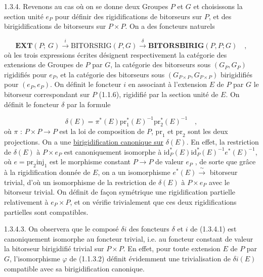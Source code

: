 1.3.4.  Revenons au cas où on se donne deux Groupes $P$ et $G$  et choisissons la section unité $e_P$ pour définir des rigidifications de bitorseurs sur $P$, et des birigidifications de bitorseurs sur $P\times P$. On a des foncteurs naturels

\begin{equation}\tag{1.3.4.1}
\mathbf{EXT}(P;\ G) \xrightarrow{\ i\ } \mathrm{BITORSRIG}(P,G) \xrightarrow{\ \delta\ } \mathbf{BITORSBIRIG}(P,P;G) \quad ,
\end{equation}
où les trois expressions écrites désignent respectivement la catégorie des extensions de Groupes de $P$ par $G$, la catégorie des bitorseurs sous $(G_P,G_P)$ rigidifiés pour $e_P$, et la catégorie des bitorseurs sous $(G_{P\times P},G_{P\times P})$ birigidifiés pour $(e_P,e_P)$. On définit le foncteur $i$ en associant à l'extension $E$ de $P$ par $G$ le bitorseur correspondant sur $P$ (1.1.6), rigidifié par la section unité de $E$. On définit le foncteur $\delta$ par la formule

\begin{equation}\tag{1.3.4.2}
\delta(E) = \pi^*(E)\mathrm{pr}_1^*(E)^{-1}\mathrm{pr}_2^*(E)^{-1} \quad ,
\end{equation}
où $\pi$ : $P\times P \longrightarrow P$ est la loi de composition de $P$, $\mathrm{pr}_1$ et $\mathrm{pr}_2$ sont les deux projections. On a une \underline{birigidification canonique sur} $\delta(E)$. En effet, la restriction de $\delta(E)$ à $P\times e_P$ est canoniquement isomorphe à $\mathrm{id}_P^*(E)\mathrm{id}_P^*(E)^{-1}e^*(E)^{-1}$, où $e = \mathrm{pr}_2\mathrm{inj}_1$ est le morphisme constant $P \longrightarrow P$ de valeur $e_P$ , de sorte que grâce à la rigidification donnée de $E$, on a un isomorphisme $e^*(E) \xrightarrow{\ \sim\ }$ bitorseur trivial, d'où un isomorphisme de la restriction de $\delta(E)$ à $P\times e_P$ avec le bitorseur trivial. On définit de façon symétrique une rigidification partielle relativement à $e_P\times P$, et on vérifie trivialement que ces deux rigidifications partielles sont compatibles.



1.3.4.3.  On observera que le composé $\delta i$ des foncteurs $\delta$ et $i$ de (1.3.4.1) est canoniquement isomorphe au foncteur trivial, i.e. au foncteur constant de valeur la bitorseur birigidifié trivial sur $P\times P$. En effet, pour toute extension $E$ de $P$ par $G$, l'isomorphisme $\varphi$ de (1.1.3.2) définit évidemment une trivialisation de $\delta i(E)$ compatible avec sa birigidification canonique.

